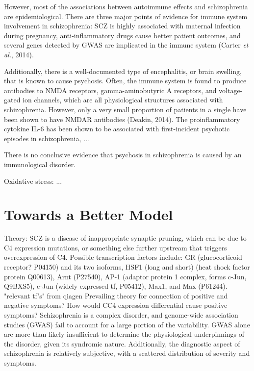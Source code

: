 \documentclass[12pt,twoside]{reedthesis}
\begin{document}
	However, most of the associations between autoimmune effects and schizophrenia are epidemiological. There are three major points of evidence for immune system involvement in schizophrenia: SCZ is highly associated with maternal infection during pregnancy, anti-inflammatory drugs cause better patient outcomes, and several genes detected by GWAS are implicated in the immune system (Carter \textit{et al.}, 2014). 
	
	Additionally, there is a well-documented type of encephalitis, or brain swelling, that is known to cause psychosis. Often, the immune system is found to produce antibodies to NMDA receptors, gamma-aminobutyric A receptors, and voltage-gated ion channels, which are all physiological structures associated with schizophrenia. However, only a very small proportion of patients in a single have been shown to have NMDAR antibodies (Deakin, 2014). The proinflammatory cytokine IL-6 has been shown to be associated with first-incident psychotic episodes in schizophrenia, ...
	
	
	There is no conclusive evidence that psychosis in schizophrenia is caused by an immunological disorder. 
	
	Oxidative stress: ...
	
	\section{Towards a Better Model}
	Theory: SCZ is a disease of inappropriate synaptic pruning, which can be due to C4 expression mutations, or something else further upstream that triggers overexpression of C4. Possible transcription factors include: GR (glucocorticoid receptor? P04150) and its two isoforms, HSF1 (long and short) (heat shock factor protein Q00613), Arnt (P27540), AP-1 (adaptor protein 1 complex, forms c-Jun, Q9BXS5), c-Jun (widely expressed tf, P05412), Max1, and Max (P61244). "relevant tf's" from qiagen
	Prevailing theory for connection of positive and negative symptoms? How would CC4 expression differential cause positive symptoms? 
	Schizophrenia is a complex disorder, and genome-wide association studies (GWAS) fail to account for a large portion of the variability. GWAS alone are more than likely insufficient to determine the physiological underpinnings of the disorder, given its syndromic nature. Additionally, the diagnostic aspect of schizophrenia is relatively subjective, with a scattered distribution of severity and symptoms. 
	
\end{document}
